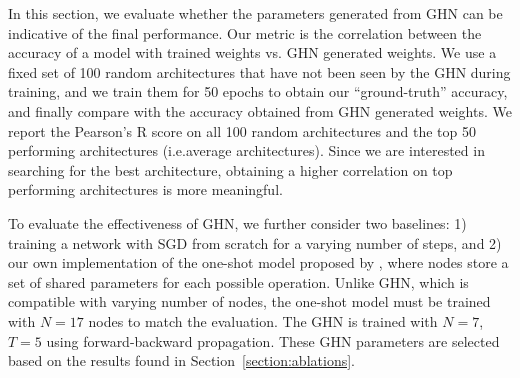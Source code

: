\documentclass{article} %
\begin{document}
In this section, we evaluate  whether the parameters generated from GHN can be indicative of the
final performance. Our metric is the correlation between the accuracy of a model with trained
weights vs. GHN generated weights. We use a fixed set of 100 random architectures that have not been
seen by the GHN during training, and we train them for 50 epochs to obtain our ``ground-truth''
accuracy, and finally compare with the accuracy obtained from GHN generated weights. We report the
Pearson's R score on all 100 random architectures and the top 50 performing architectures (i.e.\above average architectures). Since we are interested in searching for the best architecture,
obtaining a higher correlation on top performing architectures is more meaningful.

To evaluate the effectiveness of GHN, we further consider two baselines: 1) training a network with
SGD from scratch for a varying number of steps, and 2) our own implementation of the one-shot model
proposed by \citet{pham2018efficient}, where nodes store a set of shared parameters for each
possible operation. Unlike GHN, which is compatible with varying number of nodes, the one-shot model
must be trained with $N=17$ nodes to match the evaluation. The GHN is trained with $N=7$, $T=5$
using forward-backward propagation. These GHN parameters are selected based on the results found in
Section~\ref{section:ablations}.
\end{document}
